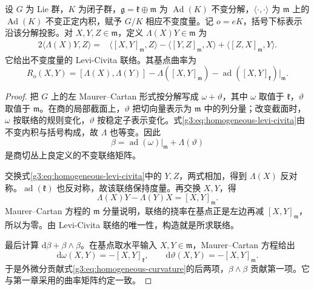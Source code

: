 \begin{proposition}\label{g3:prop:homogeneous-connection-formula}
	设 \(G\) 为 Lie 群，\(K\) 为闭子群，\(\mathfrak g=\mathfrak k\oplus\mathfrak m\) 为 \(\operatorname{Ad}(K)\) 不变分解，\(\langle\cdot,\cdot\rangle\) 为 \(\mathfrak m\) 上的 \(\operatorname{Ad}(K)\) 不变正定内积，赋予 \(G/K\) 相应不变度量。记 \(o=eK\)，括号下标表示沿该分解投影。对 \(X,Y,Z\in\mathfrak m\)，定义 \(\Lambda(X)Y\in\mathfrak m\) 为
	\begin{equation}\label{g3:eq:homogeneous-levi-civita}
		\begin{aligned}
		2\langle\Lambda(X)Y,Z\rangle
		={}&\langle[X,Y]_{\mathfrak m},Z\rangle
		-\langle[Y,Z]_{\mathfrak m},X\rangle
		+\langle[Z,X]_{\mathfrak m},Y\rangle.
		\end{aligned}
	\end{equation}
	它给出不变度量的 Levi-Civita 联络。其基点曲率为
	\begin{equation}\label{g3:eq:homogeneous-curvature}
		R_o(X,Y)
		=[\Lambda(X),\Lambda(Y)]-\Lambda([X,Y]_{\mathfrak m})
		-\operatorname{ad}([X,Y]_{\mathfrak k})|_{\mathfrak m}.
	\end{equation}
\end{proposition}
\begin{proof}
	把 \(G\) 上的左 Maurer--Cartan 形式按分解写成 \(\omega+\vartheta\)，其中 \(\omega\) 取值于 \(\mathfrak k\)，\(\vartheta\) 取值于 \(\mathfrak m\)。在商的局部截面上，\(\vartheta\) 把切向量表示为 \(\mathfrak m\) 中的列分量；改变截面时，\(\omega\) 按联络的规则变化，\(\vartheta\) 按稳定子表示变化。式\eqref{g3:eq:homogeneous-levi-civita}由不变内积与括号构成，故 \(\Lambda\) 也等变。因此
	\[
		\beta=\operatorname{ad}(\omega)|_{\mathfrak m}+\Lambda(\vartheta)
	\]
	是商切丛上良定义的不变联络矩阵。

	交换式\eqref{g3:eq:homogeneous-levi-civita}中的 \(Y,Z\)，两式相加，得到 \(\Lambda(X)\) 反对称。\(\operatorname{ad}(\mathfrak k)\) 也反对称，故该联络保持度量。再交换 \(X,Y\)，得
	\[
		\Lambda(X)Y-\Lambda(Y)X=[X,Y]_{\mathfrak m}.
	\]
	Maurer--Cartan 方程的 \(\mathfrak m\) 分量说明，联络的挠率在基点正是左边再减 \([X,Y]_{\mathfrak m}\)，所以为零。由 Levi-Civita 联络的唯一性，构造就是所求联络。

	最后计算 \(\mathrm d\beta+\beta\wedge\beta\)。在基点取水平输入 \(X,Y\in\mathfrak m\)，Maurer--Cartan 方程给出
	\[
		\mathrm d\omega(X,Y)=-[X,Y]_{\mathfrak k},\qquad
		\mathrm d\vartheta(X,Y)=-[X,Y]_{\mathfrak m}.
	\]
	于是外微分贡献式\eqref{g3:eq:homogeneous-curvature}的后两项，\(\beta\wedge\beta\) 贡献第一项。它与第一章采用的曲率矩阵约定一致。
\end{proof}

